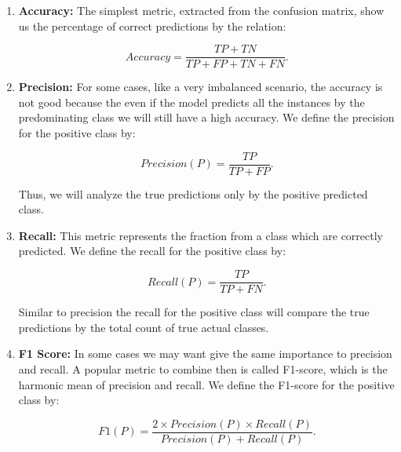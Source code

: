 	\begin{enumerate}
		\item \textbf{Accuracy:} The simplest metric, extracted from the confusion matrix, show us the percentage of correct predictions by the relation:
		
		\begin{equation}
			Accuracy = \frac{TP + TN}{TP + FP + TN + FN} \text{.}
		\end{equation}
		
		\item \textbf{Precision:} For some cases, like a very imbalanced scenario, the accuracy is not good because the even if the model predicts all the instances by the predominating class we will still have a high accuracy. We define the precision for the positive class by:
		
		\begin{equation}
			Precision(P) = \frac{TP}{TP + FP} \text{.}
		\end{equation}
	
		Thus, we will analyze the true predictions only by the positive predicted class.
		
		\item \textbf{Recall:} This metric represents the fraction from a class which are correctly predicted. We define the recall for the positive class by:
		
		\begin{equation}
			Recall(P) = \frac{TP}{TP + FN} \text{.}
		\end{equation}
		
		Similar to precision the recall for the positive class will compare the true predictions by the total count of true actual classes.
		
		\item \textbf{F1 Score:} In some cases we may want give the same importance to precision and recall. A popular metric to combine then is called F1-score, which is the harmonic mean of precision and recall. We define the F1-score for the positive class by:
		
		\begin{equation}
			F1(P) = \frac{2 \times Precision(P) \times Recall(P)}{Precision(P) + Recall(P)} \text{.}
		\end{equation}
	
	\end{enumerate}
	
	